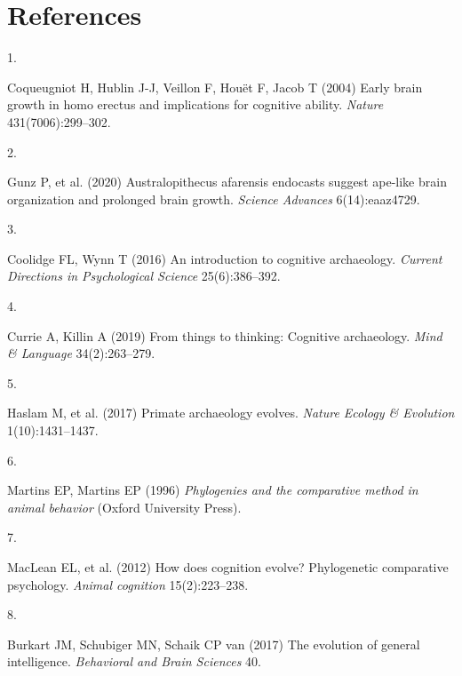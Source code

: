 \documentclass[
  man,floatsintext]{apa6}
\newlength{\cslhangindent}
\newlength{\csllabelwidth}
\newlength{\cslentryspacingunit} %
\newenvironment{CSLReferences}[2] %
 {%
  \setlength{\parindent}{0pt}
  \ifodd #1
  \let\oldpar\par
  \def\par{\hangindent=\cslhangindent\oldpar}
  \fi
  \setlength{\parskip}{#2\cslentryspacingunit}
 }%
 {}
\newcommand{\CSLLeftMargin}[1]{\parbox[t]{\csllabelwidth}{#1}}
\newcommand{\CSLRightInline}[1]{\parbox[t]{\linewidth - \csllabelwidth}{#1}\break}
\begin{document}
\newpage

\hypertarget{references}{%
\section{References}\label{references}}

\begingroup
\setlength{\parindent}{-0.5in}
\setlength{\leftskip}{0.5in}

\hypertarget{refs}{}
\begin{CSLReferences}{0}{0}
\leavevmode{}%
\CSLLeftMargin{1. }%
\CSLRightInline{Coqueugniot H, Hublin J-J, Veillon F, Houët F, Jacob T (2004) Early brain growth in homo erectus and implications for cognitive ability. \emph{Nature} 431(7006):299--302.}

\leavevmode{}%
\CSLLeftMargin{2. }%
\CSLRightInline{Gunz P, et al. (2020) Australopithecus afarensis endocasts suggest ape-like brain organization and prolonged brain growth. \emph{Science Advances} 6(14):eaaz4729.}

\leavevmode{}%
\CSLLeftMargin{3. }%
\CSLRightInline{Coolidge FL, Wynn T (2016) An introduction to cognitive archaeology. \emph{Current Directions in Psychological Science} 25(6):386--392.}

\leavevmode{}%
\CSLLeftMargin{4. }%
\CSLRightInline{Currie A, Killin A (2019) From things to thinking: Cognitive archaeology. \emph{Mind \& Language} 34(2):263--279.}

\leavevmode{}%
\CSLLeftMargin{5. }%
\CSLRightInline{Haslam M, et al. (2017) Primate archaeology evolves. \emph{Nature Ecology \& Evolution} 1(10):1431--1437.}

\leavevmode{}%
\CSLLeftMargin{6. }%
\CSLRightInline{Martins EP, Martins EP (1996) \emph{Phylogenies and the comparative method in animal behavior} (Oxford University Press).}

\leavevmode{}%
\CSLLeftMargin{7. }%
\CSLRightInline{MacLean EL, et al. (2012) How does cognition evolve? Phylogenetic comparative psychology. \emph{Animal cognition} 15(2):223--238.}

\leavevmode{}%
\CSLLeftMargin{8. }%
\CSLRightInline{Burkart JM, Schubiger MN, Schaik CP van (2017) The evolution of general intelligence. \emph{Behavioral and Brain Sciences} 40.}


\end{CSLReferences}
\end{document}

